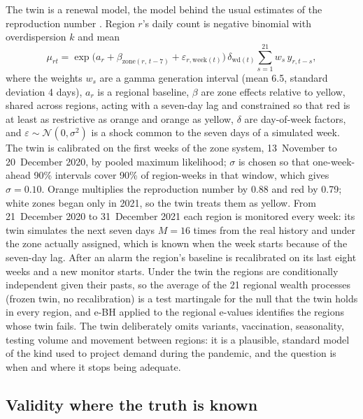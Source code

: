 The twin is a renewal model, the model behind the usual estimates of the
reproduction number \citep{cori2013new}. Region $r$'s daily count is negative
binomial with overdispersion $k$ and mean
\[
\mu_{rt} = \exp\big(a_r + \beta_{\mathrm{zone}(r,\,t-7)} + \varepsilon_{r,\mathrm{week}(t)}\big)\,
\delta_{\mathrm{wd}(t)} \sum_{s=1}^{21} w_s\, y_{r,t-s},
\]
where the weights $w_s$ are a gamma generation interval (mean 6.5, standard
deviation 4 days), $a_r$ is a regional baseline, $\beta$ are zone effects
relative to yellow, shared across regions, acting with a seven-day lag and
constrained so that red is at least as restrictive as orange and orange as
yellow, $\delta$ are day-of-week factors, and
$\varepsilon \sim \mathcal N(0, \sigma^2)$ is a shock common to the seven days
of a simulated week. The twin is calibrated on the first weeks of the zone
system, 13~November to 20~December 2020, by pooled maximum likelihood; $\sigma$
is chosen so that one-week-ahead 90\% intervals cover 90\% of region-weeks in
that window, which gives $\sigma = 0.10$. Orange multiplies the reproduction
number by 0.88 and red by 0.79; white zones began only in 2021, so the twin
treats them as yellow. From 21~December 2020 to 31~December 2021 each region is
monitored every week: its twin simulates the next seven days $M = 16$ times
from the real history and under the zone actually assigned, which is known when
the week starts because of the seven-day lag. After an alarm the region's
baseline is recalibrated on its last eight weeks and a new monitor starts.
Under the twin the regions are conditionally independent given their pasts, so
the average of the 21 regional wealth processes (frozen twin, no
recalibration) is a test martingale for the null that the twin holds in every
region, and e-BH applied to the regional e-values identifies the regions whose
twin fails. The twin deliberately omits variants, vaccination, seasonality,
testing volume and movement between regions: it is a plausible, standard model
of the kind used to project demand during the pandemic, and the question is
when and where it stops being adequate.

\subsection{Validity where the truth is known}\label{sec:italy-synth}

